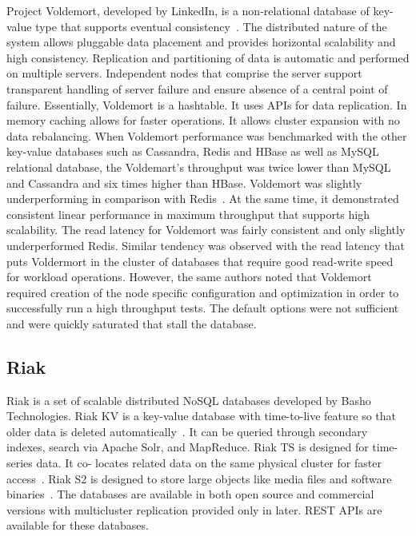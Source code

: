 Project Voldemort, developed by LinkedIn, is a non-relational database
of key-value type that supports eventual
consistency~\cite{www-voldemort}.  The distributed nature of the
system allows pluggable data placement and provides horizontal
scalability and high consistency. Replication and partitioning of data
is automatic and performed on multiple servers. Independent nodes that
comprise the server support transparent handling of server failure and
ensure absence of a central point of failure. Essentially, Voldemort
is a hashtable. It uses APIs for data replication. In memory caching
allows for faster operations. It allows cluster expansion with no data
rebalancing.  When Voldemort performance was benchmarked with the
other key-value databases such as Cassandra, Redis and HBase as well
as MySQL relational database, the Voldemart's throughput was twice
lower than MySQL and Cassandra and six times higher than
HBase. Voldemort was slightly underperforming in comparison with
Redis~\cite{rabl-sadoghi-jacobsen-2012}.  At the same time, it
demonstrated consistent linear performance in maximum throughput that
supports high scalability. The read latency for Voldemort was fairly
consistent and only slightly underperformed Redis. Similar tendency
was observed with the read latency that puts Voldermort in the cluster
of databases that require good read-write speed for workload
operations. However, the same authors noted that Voldemort required
creation of the node specific configuration and optimization in order
to successfully run a high throughput tests. The default options were
not sufficient and were quickly saturated that stall the database.

     \pv
     
\subsection{Riak}

Riak is a set of scalable distributed NoSQL databases developed by
Basho Technologies. Riak KV is a key-value database with time-to-live
feature so that older data is deleted
automatically~\cite{www-riak-kv}.  It can be queried through secondary
indexes, search via Apache Solr, and MapReduce. Riak TS is designed
for time-series data. It co- locates related data on the same physical
cluster for faster access~\cite{www-riak-ts}. Riak S2 is designed to
store large objects like media files and software
binaries~\cite{www-riak-s2}. The databases are available in both open
source and commercial versions with multicluster replication provided
only in later. REST APIs are available for these databases.

